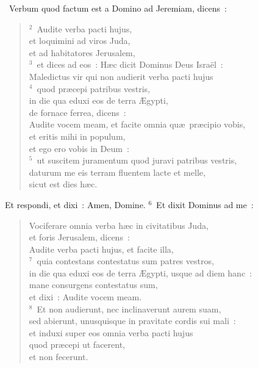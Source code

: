 ~Verbum quod factum est a Domino ad Jeremiam, dicens~:
\begin{flushleft}\begin{verse}\vspace{6pt}${}^{2}$~Audite verba pacti hujus,\\ et loquimini ad viros Juda,\\ et ad habitatores Jerusalem,\\
${}^{3}$~et dices ad eos~: H\ae c dicit Dominus Deus Isra\"el~:\\ Maledictus vir qui non audierit verba pacti hujus\\
${}^{4}$~quod pr\ae cepi patribus vestris,\\ in die qua eduxi eos de terra \AE gypti,\\ de fornace ferrea, dicens~:\\ Audite vocem meam, et facite omnia qu\ae\ pr\ae cipio vobis,\\ et eritis mihi in populum,\\ et ego ero vobis in Deum~:\\
${}^{5}$~ut suscitem juramentum quod juravi patribus vestris,\\ daturum me eis terram fluentem lacte et melle,\\ sicut est dies h\ae c.\end{verse}\end{flushleft}

 Et respondi, et dixi~: Amen, Domine.
${}^{6}$~Et dixit Dominus ad me~: \begin{flushleft}\begin{verse}Vociferare omnia verba h\ae c in civitatibus Juda,\\ et foris Jerusalem, dicens~:\\ Audite verba pacti hujus, et facite illa,\\
${}^{7}$~quia contestans contestatus sum patres vestros,\\ in die qua eduxi eos de terra \AE gypti, usque ad diem hanc~:\\ mane consurgens contestatus sum,\\ et dixi~: Audite vocem meam.\\
${}^{8}$~Et non audierunt, nec inclinaverunt aurem suam,\\ sed abierunt, unusquisque in pravitate cordis sui mali~:\\ et induxi super eos omnia verba pacti hujus\\ quod pr\ae cepi ut facerent,\\ et non fecerunt.\end{verse}\end{flushleft}


